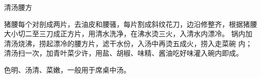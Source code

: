 \begin{recipe}{清汤腰方}

\ingredients


\cooking

\step 猪腰每个对剖成两片，去油皮和腰骚，每片割成斜纹花刀，边沿修整齐，根据猪腰
大小切二至三刀成正方片，用清水洗净，在沸水烫三火，入清水内漂冷。
\step 锅内加清汤烧沸，捞起漂冷的腰方片，滤干水份，入汤中再烫五成火，捞入走菜碗
内；清汤扫一次，加青叶菜少许，用盐、胡椒、味精、酱油吃好味灌入碗内即成。

\notes

色明、汤清、菜嫩，一般用于席桌中汤。

\end{recipe}

